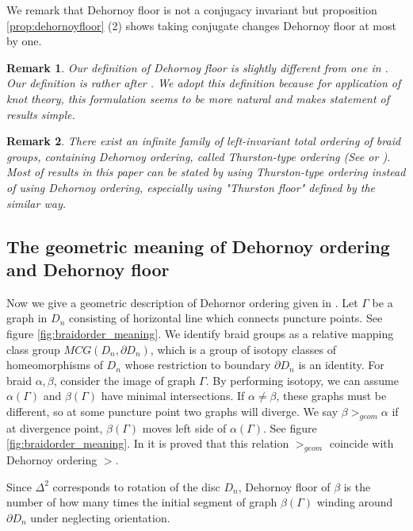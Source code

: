 \documentclass[12pt]{amsart}
\newtheorem{rem}{Remark}}
\begin{document}
   We remark that Dehornoy floor is not a conjugacy invariant but proposition \ref{prop:dehornoyfloor} (2) shows taking conjugate changes Dehornoy floor at most by one. 
 

\begin{rem}
   Our definition of Dehornoy floor is slightly different from one in \cite{ma}. Our definition is rather after \cite{mn}. We adopt this definition because for application of knot theory, this formulation seems to be more natural and makes statement of results simple. 
\end{rem} 


\begin{rem}
There exist an infinite family of left-invariant total ordering of braid groups, containing Dehornoy ordering, called {\it Thurston-type ordering} (See \cite{ddrw} or \cite{sw}). Most of results in this paper can be stated by using Thurston-type ordering instead of using Dehornoy ordering, especially using "Thurston floor" defined by the similar way.
\end{rem}

\subsection{The geometric meaning of Dehornoy ordering and Dehornoy floor}

  Now we give a geometric description of Dehornor ordering given in \cite{fgrrw}. Let $\Gamma$ be a graph in $D_{n}$ consisting of horizontal line which connects puncture points. See figure \ref{fig:braidorder_meaning}. 
We identify braid groups as a relative mapping class group $MCG(D_{n},\partial D_{n})$, which is a group of isotopy classes of homeomorphisms of $D_{n}$ whose restriction to boundary $\partial D_{n}$ is an identity. For braid $\alpha, \beta$, consider the image of graph $\Gamma$. By performing isotopy, we can assume $\alpha(\Gamma)$ and $\beta(\Gamma)$ have minimal intersections. 
If $\alpha \neq \beta$, these graphs must be different, so at some puncture point two graphs will diverge. We say $\beta >_{geom} \alpha$ if at divergence point, $\beta(\Gamma)$ moves left side of $\alpha(\Gamma)$. See figure \ref{fig:braidorder_meaning}.
In \cite{fgrrw} it is proved that this relation $>_{geom}$ coincide with Dehornoy ordering $>$.

Since $\Delta^{2}$ corresponds to rotation of the disc $D_{n}$, Dehornoy floor of $\beta$ is the number of how many times the initial segment of graph $\beta(\Gamma)$ winding around $\partial D_{n}$ under neglecting orientation.
\end{document}
